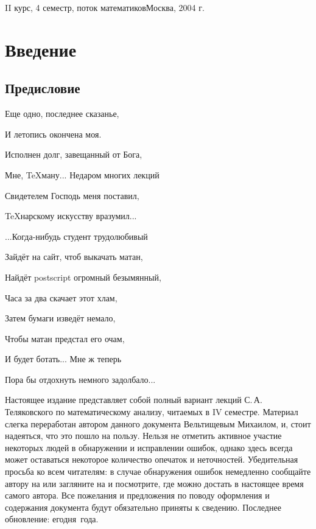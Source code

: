 \documentclass[a4paper]{article}
\begin{document}
{II курс, 4 семестр, поток математиков}{Москва, 2004 г.}
\pagebreak

\pagestyle{plain}
\tableofcontents
\pagebreak

\section*{Введение}

\subsection*{Предисловие}

{\scriptsize
{\itshape
{\hfill Еще одно, последнее сказанье,\par}
{\hfill И летопись окончена моя.\par}
{\hfill Исполнен долг, завещанный от Бога,\par}
{\hfill Мне, \TeX ману... Недаром многих лекций\par}
{\hfill Свидетелем Господь меня поставил,\par}
{\hfill \TeX нарскому искусству вразумил...\par}
\vskip 5pt
{\hfill ...Когда-нибудь студент трудолюбивый\par}
{\hfill Зайдёт на сайт, чтоб выкачать матан,\par}
{\hfill Найдёт postscript огромный безымянный,\par}
{\hfill Часа за два скачает этот хлам,\par}
{\hfill Затем бумаги изведёт немало,\par}
{\hfill Чтобы матан предстал его очам,\par}
{\hfill И будет ботать... Мне ж теперь\par}
{\hfill Пора бы отдохнуть немного задолбало...\par}
}}
\vskip 5pt

Настоящее издание представляет собой полный вариант лекций С.\,А.\,Теляковского по математическому
анализу, читаемых в IV семестре. Материал слегка переработан автором данного документа Вельтищевым
Михаилом, и, стоит надеяться, что это пошло на пользу. Нельзя не отметить активное участие некоторых людей
в обнаружении и исправлении ошибок, однако здесь всегда может оставаться некоторое количество
опечаток и неточностей. Убедительная просьба ко всем читателям: в случае обнаружения ошибок
немедленно сообщайте автору на \dmvnmail{} или загляните
на \dmvnwebsite{} и посмотрите, где можно достать в настоящее время
самого автора. Все пожелания и предложения по поводу оформления
и содержания документа будут обязательно приняты к сведению. Последнее обновление: егодня~года.
\end{document}
